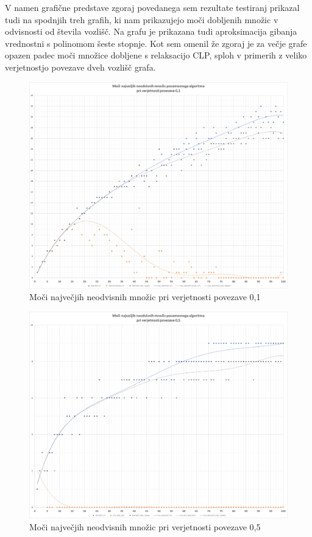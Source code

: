 \documentclass[a4paper, 12 pt]{article}
\theoremstyle{definition}
\theoremstyle{plain}
\theoremstyle{remark}
\begin{document}
V namen grafične predstave zgoraj povedanega sem rezultate testiranj prikazal tudi na spodnjih treh grafih, ki nam prikazujejo moči dobljenih množic v odvisnosti od števila vozlišč. Na grafu je prikazana tudi aproksimacija gibanja vrednostni s polinomom šeste stopnje. Kot sem omenil že zgoraj je za večje grafe opazen padec moči množice dobljene s relaksacijo CLP, sploh v primerih z veliko verjetnostjo povezave dveh vozlišč grafa. 
\begin{figure}[H]
\centering
  \includegraphics[scale=0.28]{./Slike/0,1 moci.png}
  \caption{Moči največjih neodvisnih množic pri verjetnosti povezave 0,1}
  \label{fig:moc0,1} 
\end{figure}

\begin{figure}[H]
\centering
  \includegraphics[scale=0.28]{./Slike/0,5 moci.png}
  \caption{Moči največjih neodvisnih množic pri verjetnosti povezave 0,5}
  \label{fig:moc0,5} 
\end{figure}
\end{document}
